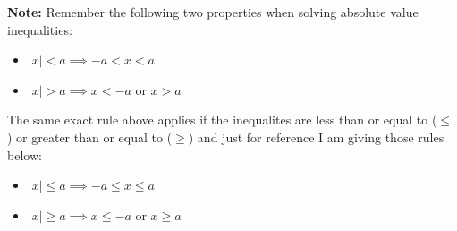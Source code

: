 \documentclass[12pt]{article}
\begin{document}
\textbf{Note:} Remember the following two properties when solving absolute value inequalities:

\begin{itemize}
\item $|x| < a \implies -a < x < a$ 
\item $|x| > a \implies x<-a$ or  $x>a$ 
\end{itemize}

The same exact rule above applies if the inequalites are less than or equal to ($\leq$) or greater than or equal to ($\geq$) and just for reference I am giving those rules below:

\begin{itemize}
\item $|x| \leq a \implies -a \leq x \leq a$
\item $|x| \geq a \implies x\leq -a$ or  $x\geq a$
\end{itemize}
\end{document}
